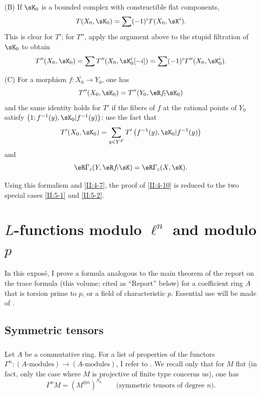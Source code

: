 \documentclass[oneside]{book}
\begin{document}
(B) If $\sK_0$ is a bounded complex with constructible flat components,
\[
  T(X_0,\sK_0) = \sum (-1)^i T(X_0,\sK^i) \text{.}
\]
This is clear for $T'$; for $T''$, apply the argument above to the stupid
filtration of $\sK_0$ to obtain
\[
  T''(X_0,\sK_0) = \sum T''(X_0,\sK_0^i[-i]) = \sum (-1)^i T''(X_0,\sK_0^i) \text{.}
\]

(C) For a morphism $f:X_0\to Y_0$, one has
\[
  T''(X_0,\sK_0) = T''(Y_0,\eR f_! \sK_0)
\]
and the same identity holds for $T'$ if the fibers of $f$ at the rational
points of $Y_0$ satisfy
$\left(1;f^{-1}(y),\sK_0|f^{-1}(y)\right)$: use the fact that
\[
  T'(X_0,\sK_0) = \sum_{y\in Y^F} T'\left(f^{-1}(y), \sK_0|f^{-1}(y)\right)
\]
and
\[
  \eR\Gamma_c(Y, \eR f_! \sK) = \eR\Gamma_c(X,\sK) \text{.}
\]

Using this formalism and \ref{II:4-7}, the proof of \ref{II:4-10} is reduced
to the two special cases \ref{II:5-1} and \ref{II:5-2}.



\chapter{\texorpdfstring{$L$}{L}-functions modulo \texorpdfstring{$\ell^n$}{l n} and modulo \texorpdfstring{$p$}{p}}\label{III}

In this exposé, I prove a formula analogous to the main theorem of the report on
the trace formula (this volume; cited as ``Report'' below) for a coefficient
ring $A$ that is torsion prime to $p$, or a field of characteristic $p$.
Essential use will be made of \cite[XVII 5.5]{sga4}.










\section{Symmetric tensors}\label{III:1}





\subsection{}\label{III:1-1}

Let $A$ be a commutative ring. For a list of properties of the functors
$\Gamma^n:(\text{$A$-modules})\to (\text{$A$-modules})$, I refer to
\cite[XVII 5.5.1 and 2]{sga4}. We recall only that for $M$ flat (in fact, only
the case where $M$ is projective of finite type concerns us), one has
\[
  \Gamma^n M = \left(M^{\otimes n}\right)^{S_n} \qquad \text{(symmetric tensors of degree $n$).}
\]
\end{document}
